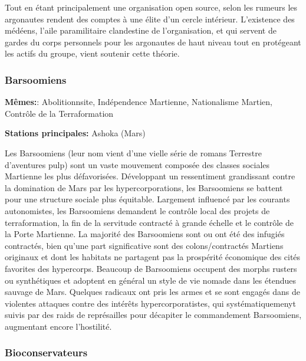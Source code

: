                                     Tout en étant principalement une organisation open source, selon les rumeurs les argonautes rendent des comptes à une élite d'un cercle intérieur. L'existence des médéens, l'aile paramilitaire clandestine de l'organisation, et qui servent de gardes du corps personnels pour les argonautes de haut niveau tout en protégeant les actifs du groupe, vient soutenir cette théorie. 

                                    \subsubsection{Barsoomiens} \label{sec:barsoomians} 

                                    \textbf{Mêmes:}: Abolitionnsite, Indépendence Martienne, Nationalisme Martien, Contrôle de la Terraformation 

                                    \textbf{Stations principales:} Ashoka (Mars) 

                                    Les Barsoomiens (leur nom vient d'une vielle série de romans Terrestre d'aventures pulp) sont un vaste mouvement composée des classes sociales Martienne les plus défavorisées. Développant un ressentiment grandissant contre la domination de Mars par les hypercorporations, les Barsoomiens se battent pour une structure sociale plus équitable. Largement influencé par les courants autonomistes, les Barsoomiens demandent le contrôle local des projets de terraformation, la fin de la servitude contracté à grande échelle et le contrôle de la Porte Martienne. La majorité des Barsoomiens sont ou ont été des infugiés contractés, bien qu'une part significative sont des colons/contractés Martiens originaux et dont les habitats ne partagent pas la prospérité économique des cités favorites des hypercorps. Beaucoup de Barsoomiens occupent des morphs rusters ou synthétiques et adoptent en général un style de vie nomade dans les étendues sauvage de Mars. Quelques radicaux ont pris les armes et se sont engagés dans de violentes attaques contre des intérêts hypercorporatistes, qui systématiquemenyt suivis par des raids de représailles pour décapiter le commandement Barsoomiens, augmentant encore l'hostilité. 

                                    \subsubsection{Bioconservateurs} \label{sec:bioconservatives} 

